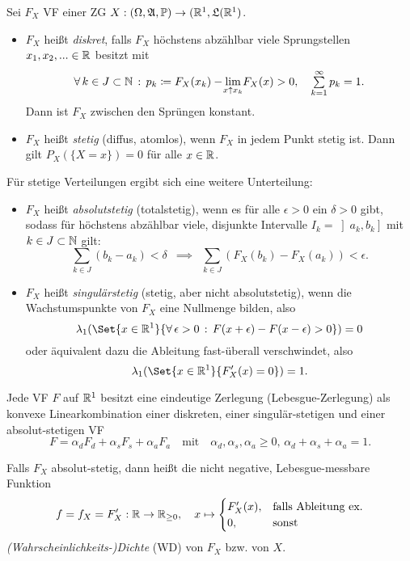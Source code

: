 \documentclass{cheat-sheet}
\newcommand{\Alg}{\mathfrak{A}} %
\newcommand{\LebAlg}{\mathfrak{L}} %
\renewcommand{\P}{\mathbb{P}} %
\begin{document}
\begin{defn}
  Sei $F_X$ VF einer ZG $X : (\Omega, \Alg, \P) \to (\R^1, \LebAlg(\R^1)$.
  \begin{itemize}
    \item $F_X$ heißt \emph{diskret}, falls $F_X$ höchstens abzählbar viele Sprungstellen $x_1, x_2, ... \in \mathbb{R}$ besitzt mit
      \[ \fa{k \in J \subset \N} p_k \coloneqq F_X(x_k) - \lim_{\mathclap{x \uparrow x_k}} F_X(x) > 0, \quad \sum_{k=1}^\infty p_k = 1. \]
    Dann ist $F_X$ zwischen den Sprüngen konstant.
    \item $F_X$ heißt \emph{stetig} (diffus, atomlos), wenn $F_X$ in jedem Punkt stetig ist. Dann gilt $P_X(\{ X = x \}) = 0$ für alle $x \in \mathbb{R}$.
  \end{itemize}
  Für stetige Verteilungen ergibt sich eine weitere Unterteilung:
  \begin{itemize}
    \item $F_X$ heißt \emph{absolutstetig} (totalstetig), wenn es für alle $\epsilon > 0$ ein $\delta > 0$ gibt, sodass für höchstens abzählbar viele, disjunkte Intervalle $I_k = \left]a_k, b_k\right]$ mit $k \in J \subset \mathbb{N}$ gilt:
    \[ \sum_{k \in J} (b_k - a_k) < \delta \enspace \implies \enspace \sum_{k \in J} (F_X(b_k) - F_X(a_k)) < \epsilon. \]
    \item $F_X$ heißt \emph{singulärstetig} (stetig, aber nicht absolutstetig), wenn die Wachstumspunkte von $F_X$ eine Nullmenge bilden, also
    \[ \lambda_1(\Set{ x \in \R^1 }{ \fa{\epsilon > 0} F(x+\epsilon)- F(x-\epsilon) > 0 }) = 0 \]
    oder äquivalent dazu die Ableitung fast-überall verschwindet, also
    \[ \lambda_1(\Set{ x \in \R^1 }{ F_X'(x) = 0 }) = 1. \]
  \end{itemize}
\end{defn}

\begin{satz}
  Jede VF $F$ auf $\mathbb{R}^1$ besitzt eine eindeutige Zerlegung (Lebesgue-Zerlegung) als konvexe Linearkombination einer diskreten, einer singulär-stetigen und einer absolut-stetigen VF
  \[ F = \alpha_d F_d + \alpha_s F_s + \alpha_a F_a \quad \text{mit} \quad \alpha_d, \alpha_s, \alpha_a \geq 0, \, \alpha_d {+} \alpha_s {+} \alpha_a = 1. \]
\end{satz}

\begin{defn}
  Falls $F_X$ absolut-stetig, dann heißt die nicht negative, Lebesgue-messbare Funktion
  \[ f = f_X = F'_X : \mathbb{R} \to \mathbb{R}_{\geq 0}, \quad x \mapsto \begin{cases} F'_X(x), & \text{falls Ableitung ex.} \\ 0, & \text{sonst} \end{cases} \]
  \emph{(Wahrscheinlichkeits-)Dichte} (WD) von $F_X$  bzw. von $X$.
\end{defn}
\end{document}
